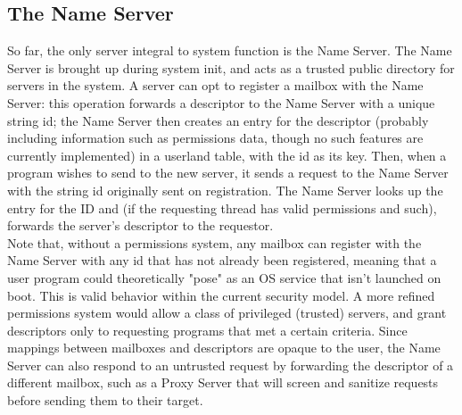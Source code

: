 \documentclass{article}
\begin{document}
\subsection{The Name Server}    
So far, the only server integral to system function is the Name Server.  The Name Server is brought up during system init, and acts as a trusted public directory for servers in the system.  A server can opt to register a mailbox with the Name Server: this operation forwards a descriptor to the Name Server with a unique string id; the Name Server then creates an entry for the descriptor (probably including information such as permissions data, though no such features are currently implemented) in a userland table, with the id as its key.  Then, when a program wishes to send to the new server, it sends a request to the Name Server with the string id originally sent on registration.  The Name Server looks up the entry for the ID and (if the requesting thread has valid permissions and such), forwards the server's descriptor to the requestor. \\

 Note that, without a permissions system, any mailbox can register with the Name Server with any id that has not already been registered, meaning that a user program could theoretically "pose" as an OS service that isn't launched on boot.  This is valid behavior within the current security model.  A more refined permissions system would allow a class of privileged (trusted) servers, and grant descriptors only to requesting programs that met a certain criteria.  Since mappings between mailboxes and descriptors are opaque to the user, the Name Server can also respond to an untrusted request by forwarding the descriptor of a different mailbox, such as a Proxy Server that will screen and sanitize requests before sending them to their target.  
\end{document}
